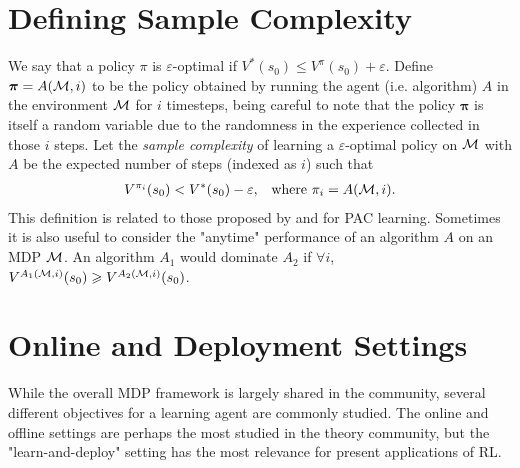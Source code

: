 

\section{Defining Sample Complexity}

We say that a policy $\pi$ is $\varepsilon$-optimal if $V^*(s_0) \le V^\pi(s_0) + \varepsilon$.
Define $\bm{\pi} = A(\mathcal{M}, i)$ to be the policy obtained by running the agent (i.e. algorithm) $A$ in the environment $\mathcal{M}$ for $i$ timesteps, being careful to note that the policy $\bm{\pi}$ is itself a random variable due to the randomness in the experience collected in those $i$ steps.
Let the \emph{sample complexity} of learning a $\varepsilon$-optimal policy on $\mathcal{M}$ with $A$ be the expected number of steps (indexed as $i$) such that
\begin{align}
    V^{\pi_i}(s_0) < V^*(s_0) - \varepsilon, && \text{where } \pi_i = A(\mathcal{M}, i).
\end{align}
This definition is related to those proposed by \citet{Fiechter1994EfficientRL} and \citet{strehl2008analysis} for PAC learning.
Sometimes it is also useful to consider the "anytime" performance of an algorithm $A$ on an MDP $\mathcal{M}$.
An algorithm $A_1$ would dominate $A_2$ if $\forall i$, $V^{A_1(\mathcal{M}, i)}(s_0) \geqslant V^{A_2(\mathcal{M}, i)}(s_0)$.



\section{Online and Deployment Settings} \label{sec:regret-deployment}

While the overall MDP framework is largely shared in the community, several different objectives for a learning agent are commonly studied.
The online and offline settings are perhaps the most studied in the theory community, but the "learn-and-deploy" setting has the most relevance for present applications of RL.


